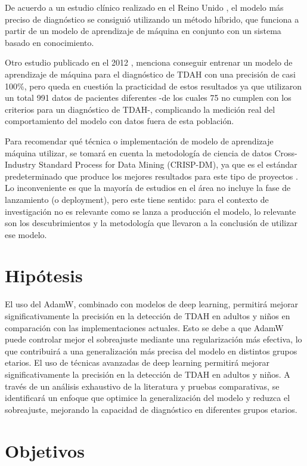 \documentclass[10pt,journal,compsoc]{IEEEtran}
\begin{document}
De acuerdo a un estudio clínico realizado en el Reino Unido \cite{chen-2023}, el modelo más preciso de diagnóstico se consiguió utilizando un método híbrido, que funciona a partir de un modelo de aprendizaje de máquina en conjunto con un sistema basado en conocimiento.

Otro estudio publicado en el 2012 \cite{wall-2012}, menciona conseguir entrenar un modelo de aprendizaje de máquina para el diagnóstico de TDAH con una precisión de casi 100\%, pero queda en cuestión la practicidad de estos resultados ya que utilizaron un total 991 datos de pacientes diferentes -de los cuales 75 no cumplen con los criterios para un diagnóstico de TDAH-, complicando la medición real del comportamiento del modelo con datos fuera de esta población.

Para recomendar qué técnica o implementación de modelo de aprendizaje máquina utilizar, se tomará en cuenta la metodología de ciencia de datos Cross-Industry Standard Process for Data Mining (CRISP-DM), ya que es el estándar predeterminado que produce los mejores resultados para este tipo de proyectos \cite{schroer-2021}. Lo inconveniente es que la mayoría de estudios en el área no incluye la fase de lanzamiento (o deployment), pero este tiene sentido: para el contexto de investigación no es relevante como se lanza a producción el modelo, lo relevante son los descubrimientos y la metodología que llevaron a la conclusión de utilizar ese modelo.

\section{Hipótesis}
El uso del AdamW, combinado con modelos de deep learning, permitirá mejorar significativamente la precisión en la detección de TDAH en adultos y niños en comparación con las implementaciones actuales. Esto se debe a que AdamW puede controlar mejor el sobreajuste mediante una regularización más efectiva, lo que contribuirá a una generalización más precisa del modelo en distintos grupos etarios.
El uso de técnicas avanzadas de deep learning permitirá mejorar significativamente la precisión en la detección de TDAH en adultos y niños. A través de un análisis exhaustivo de la literatura y pruebas comparativas, se identificará un enfoque que optimice la generalización del modelo y reduzca el sobreajuste, mejorando la capacidad de diagnóstico en diferentes grupos etarios.

\section{Objetivos}
\end{document}
